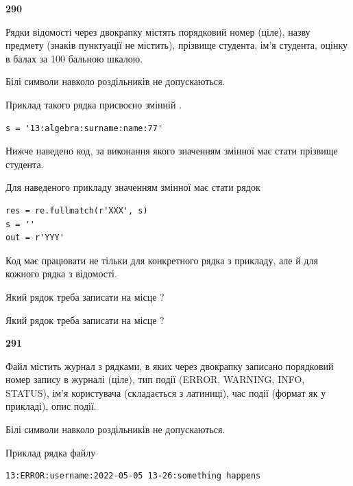 \newpage

{\begin {center}\textbf{ 290}\end {center}}\par
Рядки відомості через двокрапку містять порядковий номер (ціле), назву предмету (знаків пунктуації не містить), прізвище студента, ім'я студента, оцінку в балах за 100 бальною шкалою.

Білі символи навколо роздільників не допускаються.

Приклад такого рядка присвоєно змінній .



\begin{verbatim}
s = '13:algebra:surname:name:77'
\end{verbatim}


Нижче наведено код, за виконання якого значенням змінної  має стати прізвище студента.

Для наведеного прикладу значенням змінної  має стати рядок 



\begin{verbatim}
res = re.fullmatch(r'XXX', s)
s = ''
out = r'YYY'
\end{verbatim}


Код має працювати не тільки для конкретного рядка з прикладу, але й для кожного рядка з відомості.




Який рядок треба записати на місце  ?\par
\vspace{5mm}


Який рядок треба записати на місце  ?\par


\newpage

{\begin {center}\textbf{ 291}\end {center}}\par
Файл  містить журнал з рядками, в яких через двокрапку записано поряд\-ко\-вий номер запису в журналі (ціле), тип події (ERROR, WARNING, INFO, STATUS), ім'я користувача (складається з латиниці), час події (фор\-мат як у прикладі), опис події.

Білі символи навколо роздільників не допускаються.

Приклад рядка файлу



\begin{verbatim}
13:ERROR:username:2022-05-05 13-26:something happens
\end{verbatim}


